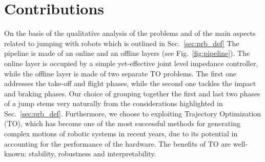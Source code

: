 \section{Contributions}\label{sec:contrib}

On the basis of the qualitative analysis of the problems and of the main aspects related to jumping with robots which is outlined in Sec.~\ref{sec:prb_def}
The pipeline is made of an online and an offline layers (see Fig.~\ref{fig:pipeline}). The online layer is occupied by a simple yet-effective joint level impedance controller, while the offline layer is made of two separate TO problems. The first one addresses the take-off and flight phases, while the second one tackles the impact and braking phases. Our choice of grouping together the first and last two phases of a jump stems very naturally from the considerations highlighted in Sec.~\ref{sec:prb_def}. Furthermore, we choose to exploiting Trajectory Optimization (TO), which has become one of the most successful methods for generating complex motions of robotic systems\cite{agile_bots::neunert2017trajectory,agile_bots::winkler2018gait,agile_bots::chignoli2021online,agile_bots::nguyen2019optimized,agile_bots::chignoli2021humanoid, agile_bots::roscia2023orientation,agile_bots::carius2019trajectory} in recent years, due to its potential in accounting for the performance of the hardware. The benefits of TO are well-known: stability, robustness and interpretability.